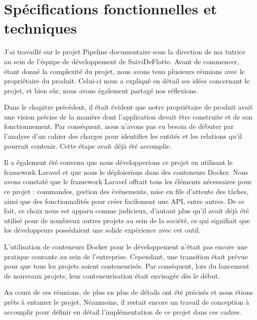 \chapter{Spécifications fonctionnelles et techniques}\label{ch:specifications-fonctionnelles-techniques}

J'ai travaillé sur le projet Pipeline documentaire sous la direction de ma tutrice au sein de l'équipe de développement de SuiviDeFlotte. Avant de commencer, étant donné la complexité du projet, nous avons tenu plusieurs réunions avec le propriétaire du produit. Celui-ci nous a expliqué en détail ses idées concernant le projet, et bien sûr, nous avons également partagé nos réflexions.

Dans le chapitre précédent, il était évident que notre propriétaire de produit avait une vision précise de la manière dont l'application devait être construite et de son fonctionnement. Par conséquent, nous n'avons pas eu besoin de débuter par l'analyse d'un cahier des charges pour identifier les entités et les relations qu'il pourrait contenir. Cette étape avait déjà été accomplie.

Il a également été convenu que nous développerions ce projet en utilisant le framework Laravel et que nous le déploierions dans des conteneurs Docker. Nous avons constaté que le framework Laravel offrait tous les éléments nécessaires pour ce projet : commandes, gestion des événements, mise en file d'attente des tâches, ainsi que des fonctionnalités pour créer facilement une API, entre autres. De ce fait, ce choix nous est apparu comme judicieux, d'autant plus qu'il avait déjà été utilisé pour de nombreux autres projets au sein de la société, ce qui signifiait que les développeurs possédaient une solide expérience avec cet outil.

L'utilisation de conteneurs Docker pour le développement n'était pas encore une pratique courante au sein de l'entreprise. Cependant, une transition était prévue pour que tous les projets soient conteneurisés. Par conséquent, lors du lancement de nouveaux projets, leur conteneurisation était envisagée dès le début.

Au cours de ces réunions, de plus en plus de détails ont été précisés et nous étions prêts à entamer le projet. Néanmoins, il restait encore un travail de conception à accomplir pour définir en détail l'implémentation de ce projet dans ces cadres.

